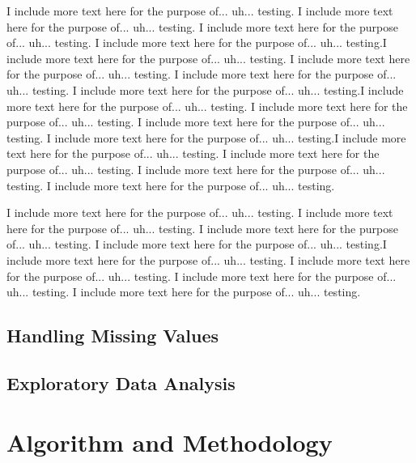 \documentclass[fleqn,10pt]{SelfArx} %
\begin{document}
I include more text here for the purpose of... uh... testing. I include more text here for the purpose of... uh... testing. I include more text here for the purpose of... uh... testing. I include more text here for the purpose of... uh... testing.I include more text here for the purpose of... uh... testing. I include more text here for the purpose of... uh... testing. I include more text here for the purpose of... uh... testing. I include more text here for the purpose of... uh... testing.I include more text here for the purpose of... uh... testing. I include more text here for the purpose of... uh... testing. I include more text here for the purpose of... uh... testing. I include more text here for the purpose of... uh... testing.I include more text here for the purpose of... uh... testing. I include more text here for the purpose of... uh... testing. I include more text here for the purpose of... uh... testing. I include more text here for the purpose of... uh... testing.

I include more text here for the purpose of... uh... testing. I include more text here for the purpose of... uh... testing. I include more text here for the purpose of... uh... testing. I include more text here for the purpose of... uh... testing.I include more text here for the purpose of... uh... testing. I include more text here for the purpose of... uh... testing. I include more text here for the purpose of... uh... testing. I include more text here for the purpose of... uh... testing.

\clearpage

\subsection{Handling Missing Values}

\subsection{Exploratory Data Analysis}


\bigskip
\bigskip


\section{Algorithm and Methodology}
\end{document}

